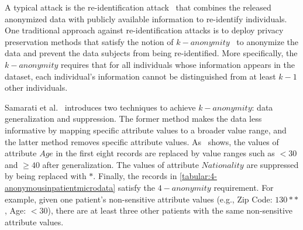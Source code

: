 A typical attack is the re-identification attack~\cite{sweeney1997weaving} that combines the released anonymized data with publicly available information to re-identify individuals. One traditional approach against re-identification attacks is to deploy privacy preservation methods that satisfy the notion of $k-anonymity$~\cite{samarati1998protecting} to anonymize the data and prevent the data subjects from being re-identified. More specifically, the $k-anonymity$ requires that for all individuals whose information appears in the dataset, each individual's information cannot be distinguished from at least $k-1$ other individuals.

Samarati et al.~\cite{samarati1998protecting} introduces two techniques to achieve $k-anonymity$: data generalization and suppression. The former method makes the data less informative by mapping specific attribute values to a broader value range, and the latter method removes specific attribute values. As~\cite{tabular:4-anonymousinpatientmicrodata} shows, the values of attribute $Age$ in the first eight records are replaced by value ranges such as $<30$ and $\geq 40$ after generalization. The values of attribute $Nationality$ are suppressed by being replaced with $*$. Finally, the records in \autoref{tabular:4-anonymousinpatientmicrodata} satisfy the $4-anonymity$ requirement. For example, given one patient's non-sensitive attribute values (e.g., Zip Code: $130**$, Age: $<30$), there are at least three other patients with the same non-sensitive attribute values.



